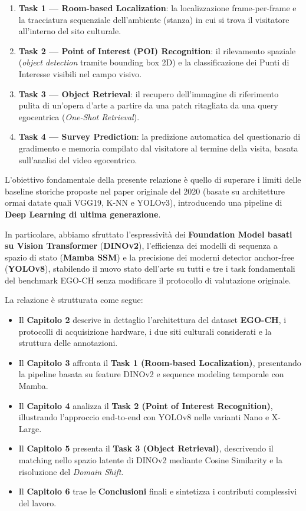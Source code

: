 \documentclass[a4paper,12pt]{report}
\begin{document}
\begin{enumerate}
    \item \textbf{Task 1 --- Room-based Localization}: la localizzazione frame-per-frame e la tracciatura sequenziale dell'ambiente (stanza) in cui si trova il visitatore all'interno del sito culturale.
    \item \textbf{Task 2 --- Point of Interest (POI) Recognition}: il rilevamento spaziale (\emph{object detection} tramite bounding box 2D) e la classificazione dei Punti di Interesse visibili nel campo visivo.
    \item \textbf{Task 3 --- Object Retrieval}: il recupero dell'immagine di riferimento pulita di un'opera d'arte a partire da una patch ritagliata da una query egocentrica (\emph{One-Shot Retrieval}).
    \item \textbf{Task 4 --- Survey Prediction}: la predizione automatica del questionario di gradimento e memoria compilato dal visitatore al termine della visita, basata sull'analisi del video egocentrico.
\end{enumerate}

L'obiettivo fondamentale della presente relazione è quello di superare i limiti delle baseline storiche proposte nel paper originale del 2020 (basate su architetture ormai datate quali VGG19, K-NN e YOLOv3), introducendo una pipeline di \textbf{Deep Learning di ultima generazione}. 

In particolare, abbiamo sfruttato l'espressività dei \textbf{Foundation Model basati su Vision Transformer} (\textbf{DINOv2}), l'efficienza dei modelli di sequenza a spazio di stato (\textbf{Mamba SSM}) e la precisione dei moderni detector anchor-free (\textbf{YOLOv8}), stabilendo il nuovo stato dell'arte su tutti e tre i task fondamentali del benchmark EGO-CH senza modificare il protocollo di valutazione originale.

La relazione è strutturata come segue:
\begin{itemize}
    \item Il \textbf{Capitolo 2} descrive in dettaglio l'architettura del dataset \textbf{EGO-CH}, i protocolli di acquisizione hardware, i due siti culturali considerati e la struttura delle annotazioni.
    \item Il \textbf{Capitolo 3} affronta il \textbf{Task 1 (Room-based Localization)}, presentando la pipeline basata su feature DINOv2 e sequence modeling temporale con Mamba.
    \item Il \textbf{Capitolo 4} analizza il \textbf{Task 2 (Point of Interest Recognition)}, illustrando l'approccio end-to-end con YOLOv8 nelle varianti Nano e X-Large.
    \item Il \textbf{Capitolo 5} presenta il \textbf{Task 3 (Object Retrieval)}, descrivendo il matching nello spazio latente di DINOv2 mediante Cosine Similarity e la risoluzione del \emph{Domain Shift}.
    \item Il \textbf{Capitolo 6} trae le \textbf{Conclusioni} finali e sintetizza i contributi complessivi del lavoro.
\end{itemize}
\end{document}
